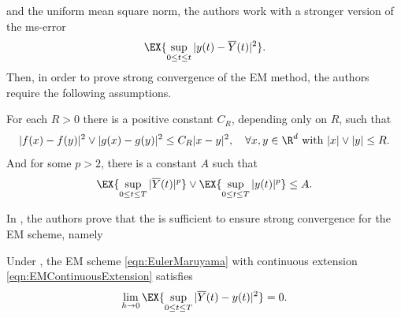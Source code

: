and the uniform mean square norm, the authors work with a stronger version of the ms-error%
$$
	\EX{\sup_{0\leq t \leq t}|y(t)-\overline{Y}(t)|^2}.
$$
%
Then, in  order to prove strong convergence of the EM method, the authors require the following assumptions.
\begin{assumption}\label{ass:HighamAssumption}
	For each $R>0$ there is a positive constant $C_R$, depending only on $R$, such that
	\begin{equation}\label{ass:LipschitzCondition}
		|f(x)-f(y)|^2 \vee |g(x)-g(y)|^2 \leq C_R|x-y|^2,
		\quad
		\forall x,y\in \R^d 
		\text{ with } |x|\vee |y|\leq R.
	\end{equation}
	And for some $p>2$, there is a constant $A$ such that
	\begin{equation}
		\EX{\sup_{0\leq t\leq T}|\overline{Y}(t)|^p}
		\vee
		\EX{\sup_{0\leq t\leq T}|y(t)|^p} \leq A.
	\end{equation}
\end{assumption}
In \cite{Higham2002b}, the authors prove that the  is sufficient to ensure strong 
convergence for the EM scheme, namely 
\begin{thm}\label{thm:HighamMaoStuart}
	Under , the EM scheme \eqref{eqn:EulerMaruyama} with continuous extension
	\eqref{eqn:EMContinuousExtension}
	satisfies
	\begin{equation}
		\lim_{h\to 0}
		\EX{\sup_{0\leq t\leq T}|\overline{Y}(t)-y(t)|^2}=0.
	\end{equation}
\end{thm}
	
